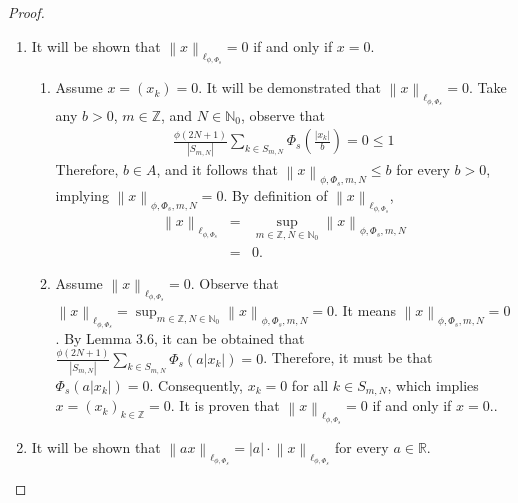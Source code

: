 \documentclass[12pt,a4paper]{article}
\theoremstyle{remark}
\begin{document}
\begin{proof}
\begin{enumerate}
        \item It will be shown that $\left\lVert x \right\rVert _{\ell_{\phi,\Phi_s}}=0$ if and only if $x=0$.
        \begin{enumerate}
            \item [$(\Leftarrow)$] Assume $x = \left(x_k\right) = 0$. It will be demonstrated that $\left\lVert x \right\rVert _{\ell_{\phi,\Phi_s}}=0$. Take any $b>0$, $m \in \mathbb{Z}$, and $N \in \mathbb{N}_0$, observe that 
            \begin{eqnarray*}
                \frac{\phi\left(2N+1\right)}{\left|S_{m,N}\right|}\sum_{k\in S_{m,N}}\Phi_s\left(\frac{\left|x_k\right|}{b}\right)=0 \leq 1
            \end{eqnarray*}
            Therefore, $b \in A$, and it follows that $\left\lVert x \right\rVert _{\phi, \Phi_s, m, N}\leq b$ for every $b>0$, implying $\left\lVert x \right\rVert _{\phi, \Phi_s, m, N}=0$. By definition of $\left\lVert x \right\rVert _{\ell_{\phi,\Phi_s}}$,
            \begin{eqnarray*}
                \left\lVert x \right\rVert _{\ell_{\phi,\Phi_s}}&=&\sup_{m \in \mathbb{Z}, N \in \mathbb{N}_0} \left\lVert x \right\rVert _{\phi, \Phi_s, m, N}\\
                   &=&0.
            \end{eqnarray*}
               
            \item[($\Rightarrow$)] Assume $\left\lVert x \right\rVert _{\ell_{\phi,\Phi_s}}=0$. Observe that $\left\lVert x\right\rVert _{\ell_{\phi,\Phi_s}} =\sup_{m\in\mathbb{Z}, N\in\mathbb{N}_0} \left\lVert x\right\rVert _{\phi,\Phi_s, m, N}=0$. It means $\left\lVert x\right\rVert _{\phi,\Phi_s, m, N}=0$. By Lemma 3.6, it can be obtained that $\frac{\phi\left(2N+1\right)}{\left|S_{m,N}\right|}\sum_{k\in S_{m,N}}\Phi_s\left(a\left|x_k\right|\right)=0$. Therefore, it must be that $\Phi_s\left(a\left|x_k\right|\right) = 0$. Consequently, $x_k = 0$ for all $k \in S_{m,N}$, which implies $x = \left(x_k\right)_{k\in \mathbb{Z}} = 0$. 
            It is proven that $\left\lVert x \right\rVert _{\ell_{\phi,\Phi_s}}=0$ if and only if $x=0$..
        \end{enumerate}
        
        \item It will be shown that $\left\lVert ax \right\rVert _{\ell_{\phi,\Phi_s}}=\left|a\right|\cdot\left\lVert x \right\rVert _{\ell_{\phi,\Phi_s}}$ for every $a \in \mathbb{R}$.
        

\end{enumerate}
\end{proof}
\end{document}
